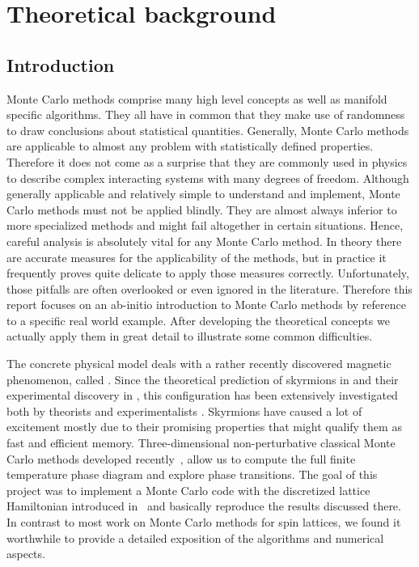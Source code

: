 %
\chapter{Theoretical background}\label{chap:1}
%
\section{Introduction}\label{sec:intro}
%
Monte Carlo methods comprise many high level concepts as well as manifold
specific algorithms. They all have in common that they make use of randomness to
draw conclusions about statistical quantities. Generally, Monte Carlo methods
are applicable to almost any problem with statistically defined properties.
Therefore it does not come as a surprise that they are commonly used in physics
to describe complex interacting systems with many degrees of freedom. Although
generally applicable and relatively simple to understand and implement, Monte
Carlo methods must not be applied blindly. They are almost always inferior to
more specialized methods and might fail altogether in certain situations. Hence,
careful analysis is absolutely vital for any Monte Carlo method. In theory there
are accurate measures for the applicability of the methods, but in practice it
frequently proves quite delicate to apply those measures correctly.
Unfortunately, those pitfalls are often overlooked or even ignored in the
literature. Therefore this report focuses on an ab-initio introduction to Monte
Carlo methods by reference to a specific real world example. After developing
the theoretical concepts we actually apply them in great detail to illustrate
some common difficulties.

The concrete physical model deals with a rather recently discovered magnetic
phenomenon, called . Since the theoretical prediction of
skyrmions in   and their experimental discovery in
 , this configuration has been extensively investigated
both by theorists and experimentalists . Skyrmions have caused a
lot of excitement mostly due to their promising properties that might qualify
them as fast and efficient memory. Three-dimensional non-perturbative classical
Monte Carlo methods developed recently~\cite{skyrmionlattice}, allow us to
compute the full finite temperature phase diagram and explore phase transitions.
The goal of this project was to implement a Monte Carlo code with the
discretized lattice Hamiltonian introduced in~\cite{skyrmionlattice} and
basically reproduce the results discussed there. In contrast to most work on
Monte Carlo methods for spin lattices, we found it worthwhile to provide a
detailed exposition of the algorithms and numerical aspects.

